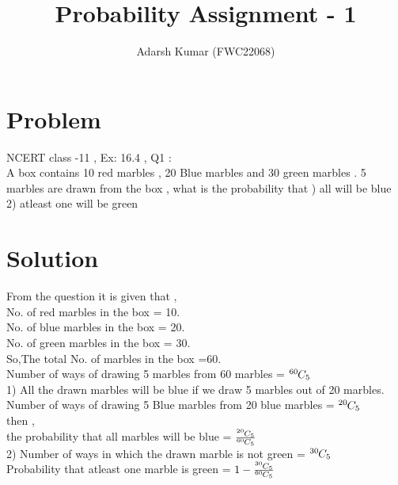 \documentclass[journal,12pt,twocolumn]{IEEEtran}
\title{\mytitle}
\title
{ Probability Assignment - 1
}
\author{Adarsh Kumar (FWC22068)}
\newcommand*{\comb}[1][-1mu]{\permcomb[#1]{C}}
\newcommand*{\permcomb}[4][0mu]{{{}^{#3}\mkern#1#2_{#4}}}
\begin{document}
\maketitle
\tableofcontents
\bigskip


\section{Problem}
NCERT class -11 , Ex: 16.4 , Q1 :\\
A box contains 10 red marbles , 20 Blue marbles and 30 green marbles . 5 marbles are drawn from the box , what is the probability that 
) all will be blue 
\\
2) atleast one will be green 
\\

\section{Solution}
From the question it is given that ,
\\
No. of red marbles in the box = 10.
\\
No. of blue marbles in the box = 20.
\\
No. of green marbles in the box = 30.
\\
So,The total No. of marbles in the box =60.\\
Number of ways of drawing 5 marbles from 60 marbles = $\comb{60}{5}$ 
\\
1) All the drawn marbles will be blue if we draw 5 marbles out of 20 marbles.
\\
Number of ways of drawing 5 Blue marbles from 20 blue marbles = $ \comb{20}{5}$
\\
then , 
\\
the probability that all marbles will be blue = $ \frac{\comb{20}{5}}{\comb{60}{5}} $    
\\
2) Number of ways in which the drawn marble is not green = $\comb{30}{5}$
\\
Probability that atleast one marble is green = $1 - \frac{\comb{30}{5}}{\comb{60}{5}}$
\end{document}
